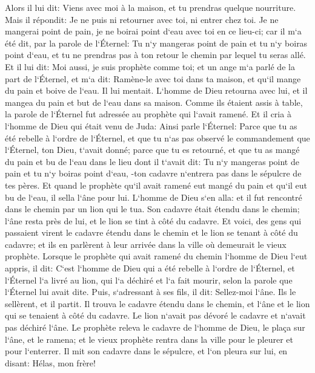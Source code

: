 \verse Alors il lui dit: Viens avec moi à la maison, et tu prendras quelque nourriture. 
\verse Mais il répondit: Je ne puis ni retourner avec toi, ni entrer chez toi. Je ne mangerai point de pain, je ne boirai point d`eau avec toi en ce lieu-ci; 
\verse car il m`a été dit, par la parole de l`Éternel: Tu n`y mangeras point de pain et tu n`y boiras point d`eau, et tu ne prendras pas à ton retour le chemin par lequel tu seras allé. 
\verse Et il lui dit: Moi aussi, je suis prophète comme toi; et un ange m`a parlé de la part de l`Éternel, et m`a dit: Ramène-le avec toi dans ta maison, et qu`il mange du pain et boive de l`eau. Il lui mentait. 
\verse L`homme de Dieu retourna avec lui, et il mangea du pain et but de l`eau dans sa maison. 
\verse Comme ils étaient assis à table, la parole de l`Éternel fut adressée au prophète qui l`avait ramené. 
\verse Et il cria à l`homme de Dieu qui était venu de Juda: Ainsi parle l`Éternel: Parce que tu as été rebelle à l`ordre de l`Éternel, et que tu n`as pas observé le commandement que l`Éternel, ton Dieu, t`avait donné; 
\verse parce que tu es retourné, et que tu as mangé du pain et bu de l`eau dans le lieu dont il t`avait dit: Tu n`y mangeras point de pain et tu n`y boiras point d`eau, -ton cadavre n`entrera pas dans le sépulcre de tes pères. 
\verse Et quand le prophète qu`il avait ramené eut mangé du pain et qu`il eut bu de l`eau, il sella l`âne pour lui. 
\verse L`homme de Dieu s`en alla: et il fut rencontré dans le chemin par un lion qui le tua. Son cadavre était étendu dans le chemin; l`âne resta près de lui, et le lion se tint à côté du cadavre. 
\verse Et voici, des gens qui passaient virent le cadavre étendu dans le chemin et le lion se tenant à côté du cadavre; et ils en parlèrent à leur arrivée dans la ville où demeurait le vieux prophète. 
\verse Lorsque le prophète qui avait ramené du chemin l`homme de Dieu l`eut appris, il dit: C`est l`homme de Dieu qui a été rebelle à l`ordre de l`Éternel, et l`Éternel l`a livré au lion, qui l`a déchiré et l`a fait mourir, selon la parole que l`Éternel lui avait dite. 
\verse Puis, s`adressant à ses fils, il dit: Sellez-moi l`âne. Ils le sellèrent, 
\verse et il partit. Il trouva le cadavre étendu dans le chemin, et l`âne et le lion qui se tenaient à côté du cadavre. Le lion n`avait pas dévoré le cadavre et n`avait pas déchiré l`âne. 
\verse Le prophète releva le cadavre de l`homme de Dieu, le plaça sur l`âne, et le ramena; et le vieux prophète rentra dans la ville pour le pleurer et pour l`enterrer. 
\verse Il mit son cadavre dans le sépulcre, et l`on pleura sur lui, en disant: Hélas, mon frère! 
